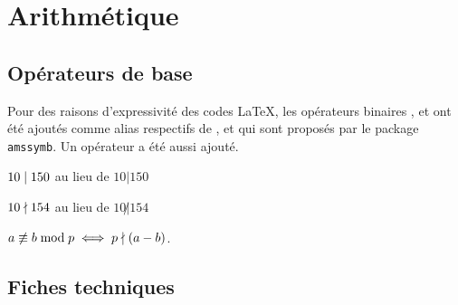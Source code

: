 \documentclass[12pt,a4paper]{article}
\begin{document}
\chapter{Arithmétique}

\section{Opérateurs de base}

Pour des raisons d'expressivité des codes \LaTeX{}, les opérateurs binaires ,  et  ont été ajoutés comme alias respectifs de ,  et  qui sont proposés par le package \verb+amssymb+. Un opérateur  a été aussi ajouté.

\begin{latexex}
$10 \mid 150$ au lieu de
$10 | 150$

$10 \nmid 154$ au lieu de
$10 \not| 154$

$a \nequiv b \modulo p
 \iff
 p \ndivides (a - b)$.
\end{latexex}




\section{Fiches techniques}



\extraspace


\extraspace

\end{document}
